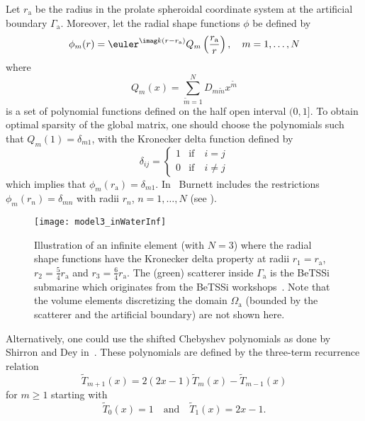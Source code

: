 Let $r_{\mathrm{a}}$ be the radius in the prolate spheroidal coordinate system at the artificial boundary $\Gamma_{\mathrm{a}}$. Moreover, let the radial shape functions $\phi$ be defined by
\begin{equation}
	\phi_m(r) = \euler^{\imag k (r-r_{\mathrm{a}})}Q_m\left(\frac{r_{\mathrm{a}}}{r}\right),\quad m = 1,\dots,N
\end{equation}
where 
\begin{equation}\label{Eq2:Q_m}
	Q_m(x) = \sum_{\tilde{m}=1}^N D_{m\tilde{m}} x^{\tilde{m}}
\end{equation}
is a set of polynomial functions defined on the half open interval $(0,1]$. To obtain optimal sparsity of the global matrix, one should choose the polynomials such that $Q_m(1) = \delta_{m1}$, with the Kronecker delta function defined by
\begin{equation}\label{Eq2:Kronecker}
	\delta_{ij} = \begin{cases}
		1 & \text{if}\quad i = j\\
		0 & \text{if}\quad i \neq j
		\end{cases}
\end{equation}
which implies that $\phi_m(r_{\mathrm{a}}) = \delta_{m1}$. In~\cite{Burnett1994atd} Burnett includes the restrictions $\phi_m(r_n) = \delta_{mn}$ with radii $r_n$, $n=1,\dots,N$ (see ).
\begin{figure}
	\centering
	\texttt{[image: model3\_inWaterInf]}
	\caption{Illustration of an infinite element (with $N=3$) where the radial shape functions have the Kronecker delta property at radii $r_1=r_{\mathrm{a}}$, $r_2=\frac54 r_{\mathrm{a}}$ and ${r_3=\frac64 r_{\mathrm{a}}}$. The (green) scatterer inside $\Gamma_{\mathrm{a}}$ is the BeTSSi submarine which originates from the BeTSSi workshops~\cite{Gilroy2013bib}. Note that the volume elements discretizing the domain $\Omega_{\mathrm{a}}$ (bounded by the scatterer and the artificial boundary) are not shown here.}
	\label{Fig2:model3_in_waterInf}
\end{figure} 
Alternatively, one could use the shifted Chebyshev polynomials as done by Shirron and Dey in~\cite{Shirron2002aie}. These polynomials are defined by the three-term recurrence relation
\begin{equation}
	\tilde{T}_{m+1}(x) = 2(2x-1)\tilde{T}_m(x) - \tilde{T}_{m-1}(x)
\end{equation}
for $m\geq 1$ starting with
\begin{equation}
	\tilde{T}_0(x) = 1\quad\text{and}\quad\tilde{T}_1(x) = 2x-1.
\end{equation}
